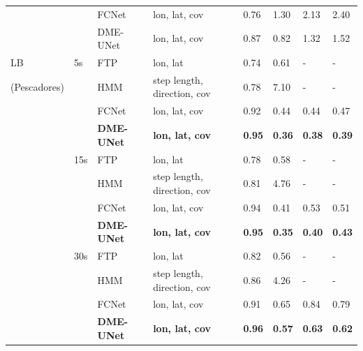 \documentclass{article}
\begin{document}
\begin{table}[h]
\begin{tabular}{llllllll}
             &     & FCNet  & lon, lat, cov          & 0.76 & 1.30 & 2.13 & 2.40 \\
             &     & DME-UNet   & lon, lat, cov  & 0.87 & 0.82 & 1.32 & 1.52 \\
    \midrule
    LB       & 5s  & FTP    & lon, lat               & 0.74 & 0.61 & - & -        \\
(Pescadores) &     & HMM    & step length, direction, cov & 0.78 & 7.10 & - & -      \\
             &     & FCNet  & lon, lat, cov          & 0.92 & 0.44 & 0.44 & 0.47  \\
             &     & \textbf{DME-UNet}   & \textbf{lon, lat, cov}  & \textbf{0.95} & \textbf{0.36} & \textbf{0.38} & \textbf{0.39}  \\
             & 15s & FTP    & lon, lat               & 0.78 & 0.58 & - & -      \\
             &     & HMM    & step length, direction, cov & 0.81 & 4.76 & - & -  \\
             &     & FCNet  & lon, lat, cov          & 0.94 & 0.41 & 0.53 & 0.51  \\
             &     & \textbf{DME-UNet}   & \textbf{lon, lat, cov}  & \textbf{0.95} & \textbf{0.35} & \textbf{0.40} & \textbf{0.43}  \\
             & 30s & FTP    & lon, lat               & 0.82 & 0.56 & - & -      \\
             &     & HMM    & step length, direction, cov & 0.86 & 4.26 & - & - \\
             &     & FCNet  & lon, lat, cov          & 0.91 & 0.65 & 0.84 & 0.79  \\
             &     & \textbf{DME-UNet}   & \textbf{lon, lat, cov}  & \textbf{0.96} & \textbf{0.57} & \textbf{0.63} & \textbf{0.62}  \\
    \bottomrule
  \end{tabular}
  \label{table2}
\end{table}
\end{document}
